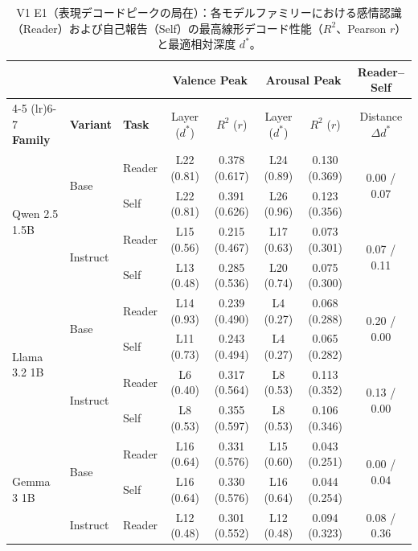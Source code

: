 \begin{table}[htbp]
\centering
\small
\caption{V1 E1（表現デコードピークの局在）：各モデルファミリーにおける感情認識（Reader）および自己報告（Self）の最高線形デコード性能（$R^2$、Pearson $r$）と最適相対深度 $d^*$。}
\label{tab:v1_peak_decodability}
\begin{tabular}{lll cccc c}
\toprule
 & & & \multicolumn{2}{c}{\textbf{Valence Peak}} & \multicolumn{2}{c}{\textbf{Arousal Peak}} & \textbf{Reader--Self} \\
\cmidrule(lr){4-5} \cmidrule(lr){6-7}
\textbf{Family} & \textbf{Variant} & \textbf{Task} & Layer ($d^*$) & $R^2$ ($r$) & Layer ($d^*$) & $R^2$ ($r$) & Distance $\Delta d^*$ \\
\midrule
\multirow{4}{*}{Qwen 2.5 1.5B} & \multirow{2}{*}{Base} & Reader & L22 (0.81) & 0.378 (0.617) & L24 (0.89) & 0.130 (0.369) & \multirow{2}{*}{0.00 / 0.07} \\
                       &                      & Self   & L22 (0.81) & 0.391 (0.626) & L26 (0.96) & 0.123 (0.356) & \\
\cmidrule(lr){2-8}
                       & \multirow{2}{*}{Instruct} & Reader & L15 (0.56) & 0.215 (0.467) & L17 (0.63) & 0.073 (0.301) & \multirow{2}{*}{0.07 / 0.11} \\
                       &                      & Self   & L13 (0.48) & 0.285 (0.536) & L20 (0.74) & 0.075 (0.300) & \\
\midrule
\multirow{4}{*}{Llama 3.2 1B} & \multirow{2}{*}{Base} & Reader & L14 (0.93) & 0.239 (0.490) & L4 (0.27) & 0.068 (0.288) & \multirow{2}{*}{0.20 / 0.00} \\
                       &                      & Self   & L11 (0.73) & 0.243 (0.494) & L4 (0.27) & 0.065 (0.282) & \\
\cmidrule(lr){2-8}
                       & \multirow{2}{*}{Instruct} & Reader & L6 (0.40) & 0.317 (0.564) & L8 (0.53) & 0.113 (0.352) & \multirow{2}{*}{0.13 / 0.00} \\
                       &                      & Self   & L8 (0.53) & 0.355 (0.597) & L8 (0.53) & 0.106 (0.346) & \\
\midrule
\multirow{4}{*}{Gemma 3 1B} & \multirow{2}{*}{Base} & Reader & L16 (0.64) & 0.331 (0.576) & L15 (0.60) & 0.043 (0.251) & \multirow{2}{*}{0.00 / 0.04} \\
                       &                      & Self   & L16 (0.64) & 0.330 (0.576) & L16 (0.64) & 0.044 (0.254) & \\
\cmidrule(lr){2-8}
                       & \multirow{2}{*}{Instruct} & Reader & L12 (0.48) & 0.301 (0.552) & L12 (0.48) & 0.094 (0.323) & \multirow{2}{*}{0.08 / 0.36} \\

\end{tabular}
\end{table}
